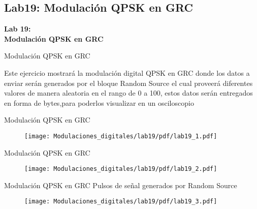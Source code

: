 \subsection{Lab19: Modulación QPSK en GRC}

\begin{frame}{}


\bfseries{\textrm{ \Large Lab 19: \\Modulación QPSK en GRC}}
\raggedright
\end{frame}

\begin{frame}{Modulación QPSK en GRC}


\justifying
Este ejercicio mostrará la modulación digital QPSK en GRC donde los datos a enviar serán generados por el bloque Random Source el cual proveerá diferentes valores de manera aleatoria en el rango de 0 a 100, estos datos serán entregados en forma de bytes,para poderlos visualizar en un osciloscopio\cite{Universidad Militar Nueva Granada}

\end{frame}
\begin{frame}{Modulación QPSK en GRC}
\begin{figure}
\texttt{[image: Modulaciones\_digitales/lab19/pdf/lab19\_1.pdf]}
\end{figure}
\end{frame}
\begin{frame}{Modulación QPSK en GRC}
\begin{figure}
\texttt{[image: Modulaciones\_digitales/lab19/pdf/lab19\_2.pdf]}
\end{figure}
\end{frame}
\begin{frame}{Modulación QPSK en GRC}
Pulsos de señal generados por Random Source
\begin{figure}
\texttt{[image: Modulaciones\_digitales/lab19/pdf/lab19\_3.pdf]}
\end{figure}
\end{frame}

